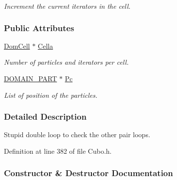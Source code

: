 \begin{DoxyCompactItemize}
\begin{DoxyCompactList}\small\item\em Increment the current iterators in the cell. \end{DoxyCompactList}\end{DoxyCompactItemize}
\subsubsection*{Public Attributes}
\begin{DoxyCompactItemize}
\item 
\hyperlink{classDomCell}{Dom\+Cell} $\ast$ \hyperlink{classDdDoubleLoop_a34021657728255effd1ed64c5d0c5906}{Cella}\hypertarget{classDdDoubleLoop_a34021657728255effd1ed64c5d0c5906}{}\label{classDdDoubleLoop_a34021657728255effd1ed64c5d0c5906}

\begin{DoxyCompactList}\small\item\em Number of particles and iterators per cell. \end{DoxyCompactList}\item 
\hyperlink{structDOMAIN__PART}{D\+O\+M\+A\+I\+N\+\_\+\+P\+A\+RT} $\ast$ \hyperlink{classDdDoubleLoop_a71fca1e109827e1efe1b06f386c44b40}{Pc}\hypertarget{classDdDoubleLoop_a71fca1e109827e1efe1b06f386c44b40}{}\label{classDdDoubleLoop_a71fca1e109827e1efe1b06f386c44b40}

\begin{DoxyCompactList}\small\item\em List of position of the particles. \end{DoxyCompactList}\end{DoxyCompactItemize}


\subsubsection{Detailed Description}
Stupid double loop to check the other pair loops. 

Definition at line 382 of file Cubo.\+h.



\subsubsection{Constructor \& Destructor Documentation}
